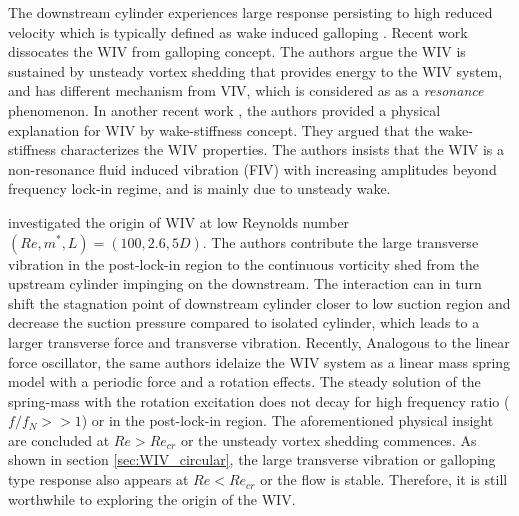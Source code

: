 
The downstream cylinder experiences large response persisting to high reduced velocity 
which is typically defined as wake induced galloping \cite{bokaian1984}. Recent work 
\cite{assi2010} dissocates the WIV from galloping concept. The authors argue the WIV is 
sustained by unsteady vortex shedding that provides energy to the WIV system, 
and has different mechanism from VIV, which is considered as 
as a \textit{resonance} phenomenon. In another recent work \cite{assi2013}, the authors provided a 
physical explanation for WIV by wake-stiffness concept. They argued that the wake-stiffness characterizes the 
WIV properties. The authors \cite{assi2010,assi2013} insists that the WIV is a non-resonance 
fluid induced vibration (FIV) with increasing amplitudes beyond frequency lock-in regime, and is mainly due to 
unsteady wake. 

\cite{Mysa2016} investigated the origin of WIV at low Reynolds number $(Re,m^*,L)=(100,2.6,5D)$. 
The authors contribute the large transverse vibration in the post-lock-in region to the 
continuous vorticity shed from the upstream cylinder impinging on the downstream. The interaction 
can in turn shift the stagnation point of downstream cylinder closer to low suction region and 
decrease the suction pressure compared to isolated cylinder, which leads to a larger transverse force 
and transverse vibration. Recently, Analogous to the linear force  oscillator, the same authors \cite{MYSA201727} idelaize the 
WIV system as a linear mass spring model with a periodic force and a rotation effects. The steady solution 
of the spring-mass with the rotation excitation does not decay for high frequency ratio ($f/f_N >> 1$) or 
in the post-lock-in region. The aforementioned physical insight are concluded at $Re>Re_{cr}$ or 
the unsteady vortex shedding commences. As shown in section \ref{sec:WIV_circular}, the large transverse 
vibration or galloping type response also appears at $Re<Re_{cr}$ or the flow is stable. Therefore, it is 
still worthwhile to exploring the origin of the WIV. 

